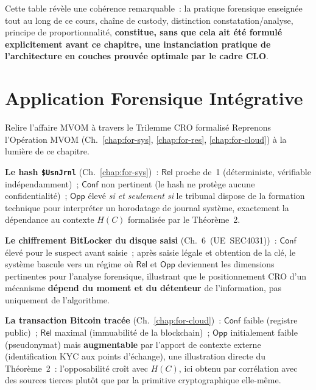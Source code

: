 Cette table révèle une cohérence remarquable~: la pratique
forensique enseignée tout au long de ce cours, chaîne de custody,
distinction constatation/analyse, principe de proportionnalité,
\textbf{constitue, sans que cela ait été formulé explicitement avant
ce chapitre, une instanciation pratique de l'architecture en couches
prouvée optimale par le cadre CLO}.

\section{Application Forensique Intégrative}
\label{sec:application-forensique}

\begin{boxscenario}{Relire l'affaire MVOM à travers le Trilemme CRO formalisé}
Reprenons l'Opération MVOM (Ch.~\ref{chap:for-sys},
\ref{chap:for-res}, \ref{chap:for-cloud}) à la lumière de ce
chapitre.

\textbf{Le hash \texttt{\$UsnJrnl}} (Ch.~\ref{chap:for-sys})~:
$\mathsf{Rel}$ proche de~1 (déterministe, vérifiable
indépendamment)~; $\mathsf{Conf}$ non pertinent (le hash ne protège
aucune confidentialité)~; $\mathsf{Opp}$ élevé \emph{si et seulement
si} le tribunal dispose de la formation technique pour interpréter
un horodatage de journal système, exactement la dépendance au
contexte $H(C)$ formalisée par le Théorème~2.

\textbf{Le chiffrement BitLocker du disque saisi}
(Ch.~6~(UE~SEC4031))~: $\mathsf{Conf}$ élevé pour le suspect avant
saisie~; après saisie légale et obtention de la clé, le système
bascule vers un régime où $\mathsf{Rel}$ et $\mathsf{Opp}$
deviennent les dimensions pertinentes pour l'analyse forensique,
illustrant que le positionnement CRO d'un mécanisme \textbf{dépend
du moment et du détenteur} de l'information, pas uniquement de
l'algorithme.

\textbf{La transaction Bitcoin tracée} (Ch.~\ref{chap:for-cloud})~:
$\mathsf{Conf}$ faible (registre public)~; $\mathsf{Rel}$ maximal
(immuabilité de la blockchain)~; $\mathsf{Opp}$ initialement faible
(pseudonymat) mais \textbf{augmentable} par l'apport de contexte
externe (identification KYC aux points d'échange), une
illustration directe du Théorème~2~: l'opposabilité croît avec
$H(C)$, ici obtenu par corrélation avec des sources tierces plutôt
que par la primitive cryptographique elle-même.
\end{boxscenario}

